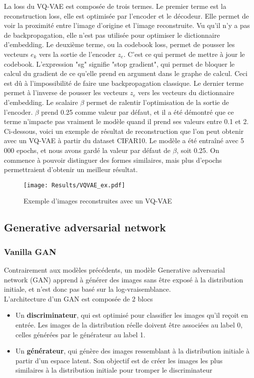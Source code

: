 \documentclass{article}
\begin{document}
La loss du VQ-VAE est composée de trois termes. Le premier terme est la reconstruction loss, elle est optimisée par l'encoder et le décodeur. Elle permet de voir la proximité entre l'image d'origine et l'image reconstruite. Vu qu'il n'y a pas de backpropagation, elle n'est pas utilisée pour optimiser le dictionnaire d'embedding.
Le deuxième terme, ou la codebook loss, permet de pousser les vecteurs $e_k$ vers la sortie de l'encoder $z_e$. C'est ce qui permet de mettre à jour le codebook. L'expression "sg" signifie "stop gradient", qui permet de bloquer le calcul du gradient de ce qu'elle prend en argument dans le graphe de calcul. Ceci est dû à l'impossibilité de faire une backpropagation classique.  
Le dernier terme permet à l'inverse de pousser les vecteurs $z_e$ vers les vecteurs du dictionnaire d'embedding. Le scalaire $\beta$ permet de ralentir l'optimisation de la sortie de l'encoder. $\beta$ prend 0.25 comme valeur par défaut, et il a été démontré que ce terme n'impacte pas vraiment le modèle quand il prend ses valeurs entre 0.1 et 2.
Ci-dessous, voici un exemple de résultat de reconstruction que l'on peut obtenir avec un VQ-VAE à partir du dataset CIFAR10. Le modèle a été entraîné avec 5 000 epochs, et nous avons gardé la valeur par défaut de $\beta$, soit 0.25. On commence à pouvoir distinguer des formes similaires, mais plus d'epochs permettraient d'obtenir un meilleur résultat. 
\begin{figure}[H]
    \centering
    \texttt{[image: Results/VQVAE\_ex.pdf]}
    \caption{Exemple d'images reconstruites avec un VQ-VAE}
\end{figure}


\subsection{Generative adversarial network}
\subsubsection{Vanilla GAN}

Contrairement aux modèles précédents, un modèle Generative adversarial network (GAN) apprend à générer des images sans être exposé à la distribution initiale, et n'est donc pas basé sur la log-vraisemblance. \\
L'architecture d'un GAN est composée de 2 blocs
\begin{itemize}
    \item Un \textbf{discriminateur}, qui est optimisé pour classifier les images qu'il reçoit en entrée. Les images de la distribution réelle doivent être associées au label 0, celles générées par le générateur au label 1.
    \item Un \textbf{générateur}, qui génère des images ressemblant à la distribution initiale à partir d'un espace latent. Son objectif est de créer les images les plus similaires à la distribution initiale pour tromper le discriminateur
\end{itemize}
\end{document}
